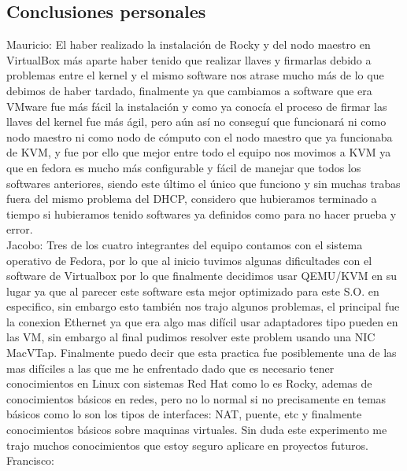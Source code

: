\subsection{Conclusiones personales}
Mauricio:
El haber realizado la instalación de Rocky y del nodo maestro en VirtualBox más aparte haber tenido que realizar llaves y firmarlas debido a problemas entre el kernel y el mismo software nos atrase mucho más de lo que debimos de haber tardado, finalmente ya que cambiamos a software que era VMware fue más fácil la instalación y como ya conocía el proceso de firmar las llaves del kernel fue más ágil, pero aún así no conseguí que funcionará ni como nodo maestro ni como nodo de cómputo con el nodo maestro que ya funcionaba de KVM, y fue por ello que mejor entre todo el equipo nos movimos a KVM ya que en fedora es mucho más configurable y fácil de manejar que todos los softwares anteriores, siendo este último el único que funciono y sin muchas trabas fuera del mismo problema del DHCP, considero que hubieramos terminado a tiempo si hubieramos tenido softwares ya definidos como para no hacer prueba y error.
\\[1em]
Jacobo:
Tres de los cuatro integrantes del equipo contamos con el sistema operativo de Fedora, por lo que al inicio tuvimos algunas dificultades con el software de Virtualbox por lo que finalmente decidimos usar QEMU/KVM en su lugar ya que al parecer este software esta mejor optimizado para este S.O. en especifico, sin embargo esto también nos trajo algunos problemas, el principal fue la conexion Ethernet ya que era algo mas difícil usar adaptadores tipo pueden en las VM, sin embargo al final pudimos resolver este problem usando una NIC MacVTap.
Finalmente puedo decir que esta practica fue posiblemente una de las mas difíciles a las que me he enfrentado dado que es necesario tener conocimientos en Linux con sistemas Red Hat como lo es Rocky, ademas de conocimientos básicos en redes, pero no lo normal si no precisamente en temas básicos como lo son los tipos de interfaces: NAT, puente, etc y finalmente conocimientos básicos sobre maquinas virtuales. Sin duda este experimento me trajo muchos conocimientos que estoy seguro aplicare en proyectos futuros.
\\[1em]
Francisco:
